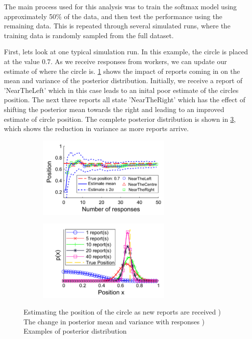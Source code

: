 The main process used for this analysis was to train the softmax model using approximately 50\% of the data, and then test the performance using the remaining data. This is repeated through several simulated runs, where the training data is randomly sampled from the full dataset. 


First, lets look at one typical simulation run. In this example, the circle is placed at the value 0.7. As we receive responses from workers, we can update our estimate of where the circle is. \ref{Figure:fusion_find_07} shows the impact of reports coming in on the mean and variance of the posterior distribution. Initially, we receive a report of 'NearTheLeft' which in this case leads to an inital poor estimate of the circles position. The next three reports all state 'NearTheRight' which has the effect of shifting the posterior mean towards the right and leading to an improved estimate of circle position. The complete posterior distribution is shown in \ref{Figure:fusion_find_07_dists}, which shows the reduction in variance as more reports arrive. 

\begin{figure}
	\centering
	\begin{subfigure}{6.5cm}
	\includegraphics[width=6.5cm]{line_find_07.png}
	\caption{}
	\label{Figure:fusion_find_07}
	\end{subfigure}
	\begin{subfigure}{6.5cm}
	\includegraphics[width=6.5cm]{line_find_07_dists.png}
	\caption{}
	\label{Figure:fusion_find_07_dists}
	\end{subfigure}
	\caption{Estimating the position of the circle as new reports are received  ) The change in posterior mean and variance with responses ) Examples of posterior distribution}
\end{figure}

